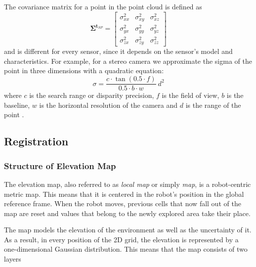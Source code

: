 \begin{enumerate}
        The covariance matrix for a point in the point cloud is defined as
        \begin{equation}
            \mathbf{\Sigma}^{\mathbf{t}_{SP}} =
            \begin{bmatrix}
                \sigma^2_{xx} & \sigma^2_{xy} & \sigma^2_{xz} \\
                \sigma^2_{yx} & \sigma^2_{yy} & \sigma^2_{yz} \\
                \sigma^2_{zx} & \sigma^2_{zy} & \sigma^2_{zz}
            \end{bmatrix}
        \end{equation}
        and is different for every sensor,
        since it depends on the sensor's model and characteristics.
        For example, for a stereo camera we approximate the sigma of
        the point in three dimensions with a quadratic equation:
        \begin{equation}
            \sigma =
            \frac{c \cdot \tan(0.5 \cdot f)}{0.5 \cdot b \cdot w} \ d^2
        \end{equation}
        where
        $c$ is the search range or disparity precision,
        $f$ is the field of view,
        $b$ is the baseline,
        $w$ is the horizontal resolution of the camera and
        $d$ is the range of the point
        \parencite{Huesing2014}.
\end{enumerate}

\subsection{Registration}

\subsubsection{Structure of Elevation Map} \label{map_structure}

The elevation map, also referred to as \textit{local map} or simply
\textit{map}, is a robot-centric metric map.
This means that it is centered in the robot's position in the
global reference frame.
When the robot moves, previous cells that now fall out of the map are
reset and values that belong to the newly explored area take their place.

The map models the elevation of the environment as well as the uncertainty
of it.
As a result, in every position of the 2D grid, the elevation is
represented by a one-dimensional Gaussian distribution.
This means that the map consists of two layers

